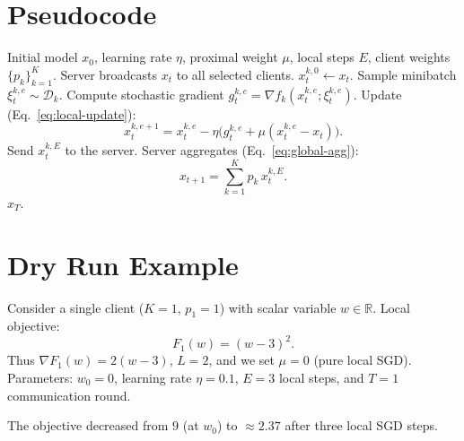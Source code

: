 \documentclass[11pt]{article}
\begin{document}
\section*{Pseudocode}
\begin{algorithm}[H]
\caption{FedProx Local SGD}
\begin{algorithmic}[1]
\REQUIRE Initial model $x_0$, learning rate $\eta$, proximal weight $\mu$, local steps $E$, client weights $\{p_k\}_{k=1}^K$.
    \STATE Server broadcasts $x_t$ to all selected clients.
        \STATE $x_{t}^{k,0}\gets x_t$.
            \STATE Sample minibatch $\xi_{t}^{k,e}\sim\mathcal{D}_k$.
            \STATE Compute stochastic gradient $g_{t}^{k,e}= \nabla f_k(x_{t}^{k,e};\xi_{t}^{k,e})$.
            \STATE Update (Eq.~\eqref{eq:local-update}):
            \[
            x_{t}^{k,e+1}=x_{t}^{k,e}
            -\eta\big(g_{t}^{k,e}+ \mu(x_{t}^{k,e}-x_t)\big).
            \]
        \ENDFOR
        \STATE Send $x_{t}^{k,E}$ to the server.
    \ENDFOR
    \STATE Server aggregates (Eq.~\eqref{eq:global-agg}):
    \[
    x_{t+1}= \sum_{k=1}^{K}p_k\,x_{t}^{k,E}.
    \]
\ENDFOR
\RETURN $x_T$.
\end{algorithmic}
\end{algorithm}

\section*{Dry Run Example}
Consider a single client ($K=1$, $p_1=1$) with scalar variable $w\in\mathbb{R}$.
Local objective:
\[
F_1(w) = (w-3)^2 .
\]
Thus $\nabla F_1(w)=2(w-3)$, $L=2$, and we set $\mu=0$ (pure local SGD).
Parameters: $w_0=0$, learning rate $\eta=0.1$, $E=3$ local steps,
and $T=1$ communication round.

The objective decreased from $9$ (at $w_0$) to $$ after three local SGD steps.
\end{document}
